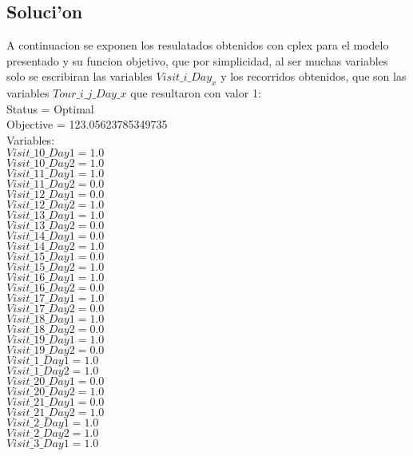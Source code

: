 \subsection{Soluci'on}
A continuacion se exponen los resulatados obtenidos con cplex para el modelo presentado y su funcion objetivo, que por simplicidad, al ser muchas variables solo se escribiran las variables $Visit\_i\_Day_x$ y los recorridos obtenidos, que son las variables $Tour\_i\_j\_Day\_x$ que resultaron con valor 1: \\
Status = Optimal\\
Objective = 123.05623785349735\\
Variables: \\
$Visit\_10\_Day1 = 1.0$\\
$Visit\_10\_Day2 = 1.0$\\
$Visit\_11\_Day1 = 1.0$\\
$Visit\_11\_Day2 = 0.0$\\
$Visit\_12\_Day1 = 0.0$\\
$Visit\_12\_Day2 = 1.0$\\
$Visit\_13\_Day1 = 1.0$\\
$Visit\_13\_Day2 = 0.0$\\
$Visit\_14\_Day1 = 0.0$\\
$Visit\_14\_Day2 = 1.0$\\
$Visit\_15\_Day1 = 0.0$\\
$Visit\_15\_Day2 = 1.0$\\
$Visit\_16\_Day1 = 1.0$\\
$Visit\_16\_Day2 = 0.0$\\
$Visit\_17\_Day1 = 1.0$\\
$Visit\_17\_Day2 = 0.0$\\
$Visit\_18\_Day1 = 1.0$\\
$Visit\_18\_Day2 = 0.0$\\
$Visit\_19\_Day1 = 1.0$\\
$Visit\_19\_Day2 = 0.0$\\
$Visit\_1\_Day1 = 1.0$\\
$Visit\_1\_Day2 = 1.0$\\
$Visit\_20\_Day1 = 0.0$\\
$Visit\_20\_Day2 = 1.0$\\
$Visit\_21\_Day1 = 0.0$\\
$Visit\_21\_Day2 = 1.0$\\
$Visit\_2\_Day1 = 1.0$\\
$Visit\_2\_Day2 = 1.0$\\
$Visit\_3\_Day1 = 1.0$\\

